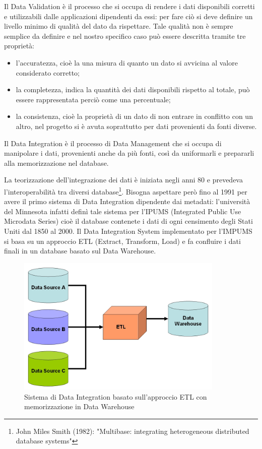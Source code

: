 \documentclass[12pt]{report}
\begin{document}
Il Data Validation è il processo che si occupa di rendere i dati disponibili corretti e utilizzabili dalle applicazioni dipendenti da essi: per fare ciò si deve definire un livello minimo di qualità del dato da rispettare. 
Tale qualità non è sempre semplice da definire e nel nostro specifico caso può essere descritta tramite tre proprietà:
\begin{itemize}
\item l'accuratezza, cioè la una misura di quanto un dato si avvicina al valore considerato corretto;
\item la completezza, indica la quantità dei dati disponibili rispetto al totale, può essere rappresentata perciò come una percentuale;
\item la consistenza, cioè la proprietà di un dato di non entrare in conflitto con un altro, nel progetto si è avuta soprattutto per dati provenienti da fonti diverse.
\end{itemize}

\vspace{5mm} %

Il Data Integration è il processo di Data Management che si occupa di manipolare i dati, provenienti anche da più fonti, così da uniformarli e prepararli alla memorizzazione nel database.

La teorizzazione dell'integrazione dei dati è iniziata negli anni 80 e prevedeva l'interoperabilità tra diversi database\footnote{John Miles Smith (1982): "Multibase: integrating heterogeneous distributed database systems"}.
Bisogna aspettare però fino al 1991 per avere il primo sistema di Data Integration dipendente dai metadati: l'università del Minnesota infatti definì tale sistema per l'IPUMS (Integrated Public Use Microdata Series) cioè il database contenete i dati di ogni censimento degli Stati Uniti dal 1850 al 2000. 
Il Data Integration System implementato per l'IMPUMS si basa su un approccio ETL (Extract, Transform, Load) e fa confluire i dati finali in un database basato sul Data Warehouse.

\begin{figure}[H]
    \centering
    \includegraphics[width=280pt]{ETL+Datawarehouse.jpg}
    \caption{Sistema di Data Integration basato sull'approccio ETL con memorizzazione in Data Warehouse}
    \label{fig:ETL_Datawarehouse}
\end{figure}
\end{document}
